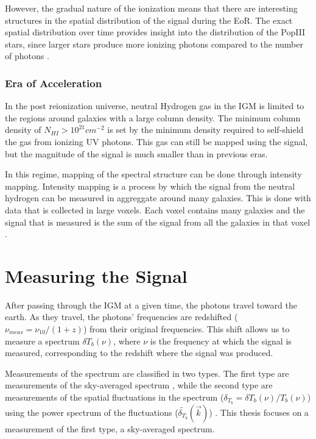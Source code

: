 However, the gradual nature of the ionization means that there are interesting structures in the spatial distribution of the \cm signal during the EoR. The exact spatial distribution over time provides insight into the distribution of the PopIII stars, since larger stars produce more ionizing photons compared to the number of \lya  photons \cite{furlanetto_2006}. 

\subsubsection{Era of Acceleration}

In the post reionization universe, neutral Hydrogen gas in the IGM is limited to the regions around galaxies with a large column density. The minimum column density of $N_{HI}>10^{21} cm^{-2}$ is set by the minimum density required to self-shield the gas from ionizing UV photons. This gas can still be mapped using the \cm signal, but the magnitude of the signal is much smaller than in previous eras. 

In this regime, mapping of the spectral structure can be done through intensity mapping. Intensity mapping is a process by which the signal from the neutral hydrogen can be measured in aggreggate around many galaxies. This is done with data that is collected in large voxels. Each voxel contains many galaxies and the \cm signal that is measured is the sum of the \cm signal from all the galaxies in that voxel \cite{masui_2012}.



\section{Measuring the \cm Signal}

After passing through the IGM at a given time, the \cm photons travel toward the earth. As they travel, the photons' frequencies are redshifted ($\nu_{meas} = \nu_{10}/(1+z)$) from their original frequencies. This shift allows us to measure a spectrum $\delta T_b (\nu)$, where $\nu$ is the frequency at which the signal is measured, corresponding to the redshift where the signal was produced. 

Measurements of the \cm spectrum are classified in two types. The first type are measurements of the sky-averaged spectrum \avgdtb, while the second type are measurements of the spatial fluctuations in the \cm spectrum ($\delta_{T_b} =  \delta T_b (\nu)/ T_b (\nu)$) using the power spectrum of the fluctuations ($ \tilde{ \delta_{T_b} } ( \vec{k} )$) \cite{natarajan_2014}. This thesis focuses on a measurement of the first type, a sky-averaged spectrum. 

